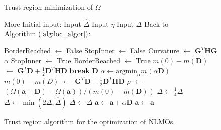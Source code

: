 \documentclass[aps,prl,reprint,amsmath,amssymb]{revtex4-1}
\begin{document}
\begin{figure}
\begin{algorithm}[H]
  \caption{Trust region minimization of $\Omega$}
  \label{alg:tr}
   \begin{algorithmic}[1]
   	\State More Initial input: 
	\State Input $\hat{\Delta}$ 
	\State Input $\eta$  
	\State Input $\Delta$ 
	\State Back to$\text{Algorithm~(\ref{alg:loc_algor})}$:

                 \State BorderReached $\gets$ False 
                 \State StopInner $\gets$ False 
                 \Repeat {}
                    \State Curvature $\gets$  $\mathbf{G}^{T}\mathbf{H}\mathbf{G}$
                       \State $\alpha$ 
                       \State StopInner $\gets$ True
                       \State BorderReached $\gets$ True
                       \State  $m(0)-m(\mathbf{D})$ $\gets$  $\mathbf{G}^{T}\mathbf{D}+\frac{1}{2}\mathbf{D}^{T}\mathbf{H}\mathbf{D}$
                       \State \textbf{break}
                    \Else
                       \State $\mathbf{D}$ 
                       \State $\alpha \gets \text{argmin}_{\alpha} m(\alpha \mathbf{D})$ 
                       \State  $m(0)-m(D)$ $\gets$  $\mathbf{G}^{T}\mathbf{D}+\frac{1}{2}\mathbf{D}^{T}\mathbf{H}\mathbf{D}$
                    \EndIf
                 \State $\rho$ $\gets$ $(\Omega(\mathbf{a}+\mathbf{D})-\Omega(\mathbf{a})) / (m(0)-m(\mathbf{D}))$
                    \State $\Delta \gets \frac{1}{4}\Delta$
                 \Else
                       \State $\Delta \gets \min{(2\Delta, \hat{\Delta})}$
                     \Else
                        \State $\Delta \gets \Delta$ 
                     \EndIf
                 \EndIf
                 \If{$\rho > \eta$}
                    \State $\mathbf{a}\gets \mathbf{a} + \alpha \mathbf{D}$ 
                  \Else
                     \State $\mathbf{a}\gets  \mathbf{a}$ 
                 \EndIf
   \end{algorithmic}
\end{algorithm}
\caption{\label{fig:tr} Trust region algorithm for the optimization of NLMOs.}
\end{figure}
\end{document}
